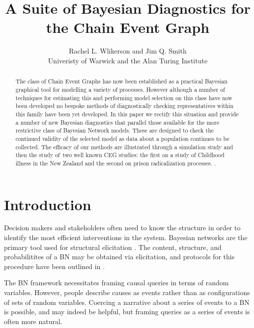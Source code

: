 \documentclass[12pt]{article}
\begin{document}
\title{A Suite of Bayesian Diagnostics for the Chain Event Graph}
\author{Rachel L. Wlikerson and Jim Q. Smith \\
Univeristy of Warwick and the Alan Turing Institute}
\maketitle

\begin{abstract}
The class of Chain Event Graphs has now been established as a practical
Bayesian graphical tool for modelling a variety of processes. However
although a number of techniques for estimating this and performing model
selection on this class have now been developed no bespoke methods of
diagnostically checking representatives within this family have been yet
developed. In this paper we rectify this situation and provide a number of
new Bayesian diagnostics that parallel those available for the more
restrictive class of Bayesian Network models. These are designed to check
the continued validity of the selected model as data about a population
continues to be collected. The efficacy of our methods are illustrated
through a simulation study and then the study of\ two well known CEG
studies: the first on a study of Childhood illness in the New Zealand and
the second on prison radicalization processes.      .
\end{abstract}

\section{Introduction }

Decision makers and stakeholders often need to know the structure in order to identify the most efficient interventions in the system. Bayesian networks are the primary tool used for structural elicitation \cite{Lord2016,Pitchforth2013}. The content, structure, and probabilitites of a BN may be obtained via elicitation, and protocols for this procedure have been outlined in \cite{EFSA} \cite{Ohagan}. 

The BN framework necessitates framing causal queries in terms of random variables. However, people describe causes as events rather than as configurations of sets of random variables. Coercing a narrative about a series of events to a BN is possible, and may indeed be helpful, but framing queries as a series of events is often more natural. 

\end{document}
